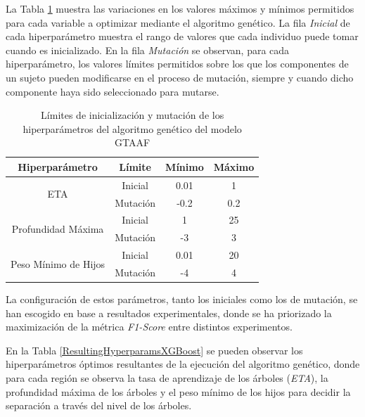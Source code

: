 La Tabla \ref{MutationXGBoostParams} muestra las variaciones en los valores máximos y mínimos permitidos para cada variable a optimizar mediante el algoritmo genético. La fila \textit{Inicial} de cada hiperparámetro muestra el rango de valores que cada individuo puede tomar cuando es inicializado. En la fila \textit{Mutación} se observan, para cada hiperparámetro, los valores límites permitidos sobre los que los componentes de un sujeto pueden modificarse en el proceso de mutación, siempre y cuando dicho componente haya sido seleccionado para mutarse.

\begin{table}[H]
	\begin{center}
		\begin{tabular}{|c|c||c|c|}
			\hline
			\textbf{Hiperparámetro} & \textbf{Límite} & \textbf{Mínimo} & \textbf{Máximo}
			\\ \hline \hline
			
			\multirow{2}{*}{ETA} &
			Inicial  & 0.01  & 1  \\ &
			Mutación & -0.2  & 0.2 \\ \hline \hline
			\multirow{2}{*}{Profundidad Máxima} &
			Inicial  & 1   & 25  \\ &
			Mutación & -3  & 3 \\ \hline \hline
			\multirow{2}{*}{Peso Mínimo de Hijos} &
			Inicial  & 0.01   & 20  \\ &
			Mutación & -4  & 4 \\ \hline \hline
		\end{tabular}
	\end{center}
	\caption{Límites de inicialización y mutación de los hiperparámetros del algoritmo genético del modelo GTAAF}
	\label{MutationXGBoostParams}
\end{table}

La configuración de estos parámetros, tanto los iniciales como los de mutación, se han escogido en base a resultados experimentales, donde se ha priorizado la maximización de la métrica \textit{F1-Score} entre distintos experimentos.

En la Tabla \ref{ResultingHyperparamsXGBoost} se pueden observar los hiperparámetros óptimos resultantes de la ejecución del algoritmo genético, donde para cada región se observa la tasa de aprendizaje de los árboles (\textit{ETA}), la profundidad máxima de los árboles y el peso mínimo de los hijos para decidir la separación a través del nivel de los árboles.

